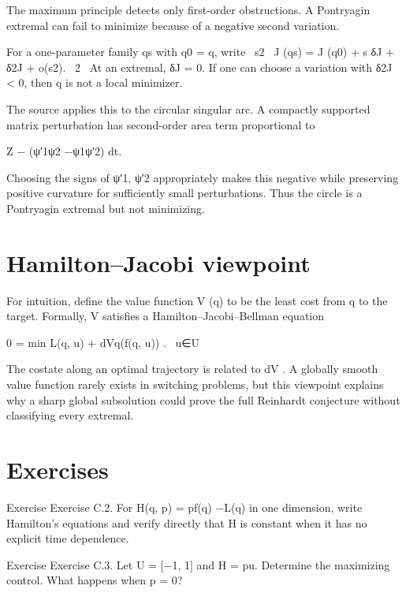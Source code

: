 The maximum principle detects only first-order obstructions. A Pontryagin extremal can fail to minimize because of a negative second variation.


\begin{displaytext}
For a one-parameter family qs with q0 = q, write \
s2 \
J (qs) = J (q0) + s δJ + δ2J + o(s2). \
2 \
At an extremal, δJ = 0. If one can choose a variation with δ2J < 0, then q is not a local minimizer.
\end{displaytext}

The source applies this to the circular singular arc. A compactly supported matrix perturbation has second-order area term proportional to


Z − (ψ′1ψ2 −ψ1ψ′2) dt.


Choosing the signs of ψ′1, ψ′2 appropriately makes this negative while preserving positive curvature for sufficiently small perturbations. Thus the circle is a Pontryagin extremal but not minimizing.


\section{Hamilton–Jacobi viewpoint}

For intuition, define the value function V (q) to be the least cost from q to the target. Formally, V satisfies a Hamilton–Jacobi–Bellman equation


\begin{displaytext}
0 = min L(q, u) + dVq(f(q, u)) . \
u∈U
\end{displaytext}

The costate along an optimal trajectory is related to dV . A globally smooth value function rarely exists in switching problems, but this viewpoint explains why a sharp global subsolution could prove the full Reinhardt conjecture without classifying every extremal.


\section{Exercises}

\begin{statementbox}{Exercise}
Exercise C.2. For H(q, p) = pf(q) −L(q) in one dimension, write Hamilton’s equations and verify directly that H is constant when it has no explicit time dependence.
\end{statementbox}

\begin{statementbox}{Exercise}
Exercise C.3. Let U = [−1, 1] and H = pu. Determine the maximizing control. What happens when p = 0?
\end{statementbox}

